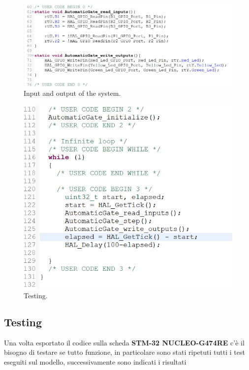 \documentclass[12pt]{article}
\begin{document}
\begin{figure}[H]
    \centering
    \includegraphics[width=1\textwidth]{snippet/input_output.png}
    \caption{Input and output of the system.}
\end{figure}
\begin{figure}[H]
    \centering
    \includegraphics[width=1\textwidth]{snippet/main.png}
    \caption{Testing.}
\end{figure}
\newpage
\subsection{Testing}
Una volta esportato il codice sulla scheda \textbf{STM-32 NUCLEO-G474RE} c'è il bisogno di testare se tutto funzione, in particolare sono stati ripetuti tutti i test eseguiti sul modello, successivamente sono indicati i risultati

\newpage
{}
\listoffigures
\end{document}
